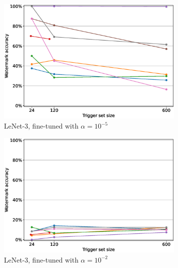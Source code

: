 \begin{figure}
\begin{subfigure}{0.41\linewidth}
        \includegraphics[width=\linewidth]{images/finetuning/lenet3_finetuning_per_arch_1e-05.eps}
        \caption{LeNet-3, fine-tuned with $\alpha=10^{-5}$}
        \label{fig:finetuning-smalllr-allmethods-perarch-lenet3}
    \end{subfigure}
    \quad
    \begin{subfigure}{0.41\linewidth}
        \includegraphics[width=\linewidth]{images/finetuning/lenet3_finetuning_per_arch_001.eps}
        \caption{LeNet-3, fine-tuned with $\alpha=10^{-2}$}
        \label{fig:finetuning-largelr-allmethods-perarch-lenet3}
    \end{subfigure}
    \quad
    \begin{subfigure}{0.41\linewidth}

\end{subfigure}
\end{figure}

